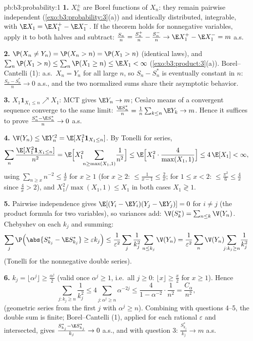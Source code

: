\begin{solution}{pb:b3:probability:1}
\textbf{1.} $X_n^{\pm}$ are Borel functions of $X_n$: they
remain pairwise independent
(\cref{exo:b3:probability:3}(a)) and identically
distributed, integrable, with $\E X_1 = \E X_1^+ - \E
X_1^-$. If the theorem holds for nonnegative variables,
apply it to both halves and subtract:
$\frac{S_n}n = \frac{S_n^+}n - \frac{S_n^-}n \to \E X_1^+ -
\E X_1^- = m$ a.s.

\textbf{2.} $\P(X_n \neq Y_n) = \P(X_n > n) = \P(X_1 > n)$
(identical laws), and $\sum_n\P(X_1 > n) \leq \sum_n\P(X_1
\geq n) \leq \E X_1 < \infty$
(\cref{exo:b3:product:3}(a)). Borel--Cantelli (1): a.s.\
$X_n = Y_n$ for all large $n$, so $S_n - S_n^*$ is
eventually constant in $n$: $\frac{S_n - S_n^*}n \to 0$
a.s., and the two normalized sums share their asymptotic
behavior.

\textbf{3.} $X_1\mathbf 1_{X_1 \leq n} \nearrow X_1$: MCT
gives $\E Y_n \to m$; Ces\`aro means of a convergent
sequence converge to the same limit: $\frac{\E S_n^*}n =
\frac1n\sum_{k\leq n}\E Y_k \to m$. Hence it suffices to
prove $\frac{S^*_n - \E S^*_n}{n} \to 0$ a.s.

\textbf{4.} $\V(Y_n) \leq \E Y_n^2 = \E[X_1^2\mathbf
1_{X_1\leq n}]$. By Tonelli for series,
\[
\sum_n\frac{\E[X_1^2\mathbf 1_{X_1\leq n}]}{n^2}
= \E\Bigl[X_1^2\!\!\sum_{n \geq \max(X_1, 1)}\!\frac1{n^2}
\Bigr]
\leq \E\Bigl[X_1^2\cdot\frac{4}{\max(X_1,1)}\Bigr]
\leq 4\,\E[X_1] < \infty,
\]
using $\sum_{n\geq x}n^{-2} \leq \frac4x$ for $x \geq 1$
(for $x \geq 2$: $\leq \frac1{x-1} \leq \frac2x$; for $1
\leq x < 2$: $\leq \frac{\pi^2}6 \leq \frac4x$ since
$\frac4x > 2$), and $X_1^2/\max(X_1, 1) \leq X_1$ in both
cases $X_1 \gtrless 1$.

\textbf{5.} Pairwise independence gives $\E[(Y_i - \E
Y_i)(Y_j - \E Y_j)] = 0$ for $i \neq j$ (the product
formula for two variables), so variances add: $\V(S^*_k) =
\sum_{n\leq k}\V(Y_n)$. Chebyshev on each $k_j$ and
summing:
\[
\sum_j\P\Bigl(\abs{S^*_{k_j} - \E S^*_{k_j}} \geq
\varepsilon k_j\Bigr)
\leq \frac1{\varepsilon^2}\sum_j\frac1{k_j^2}\sum_{n\leq
k_j}\V(Y_n)
= \frac1{\varepsilon^2}\sum_n\V(Y_n)\!\!\sum_{j : k_j\geq
n}\!\frac1{k_j^2}
\]
(Tonelli for the nonnegative double series).

\textbf{6.} $k_j = \lfloor\alpha^j\rfloor \geq
\frac{\alpha^j}2$ (valid once $\alpha^j \geq 1$, i.e.\ all
$j \geq 0$: $\lfloor x\rfloor \geq \frac x2$ for $x \geq
1$). Hence
\[
\sum_{j : k_j \geq n}\frac1{k_j^2}
\leq 4\sum_{j : \alpha^j \geq n}\alpha^{-2j}
\leq \frac{4}{1 - \alpha^{-2}}\cdot\frac1{n^2}
= \frac{C_\alpha}{n^2},
\]
(geometric series from the first $j$ with $\alpha^j \geq
n$). Combining with questions 4--5, the double sum is
finite; Borel--Cantelli (1), applied for each rational
$\varepsilon$ and intersected, gives
$\frac{S^*_{k_j} - \E S^*_{k_j}}{k_j} \to 0$ a.s., and with
question 3: $\frac{S^*_{k_j}}{k_j} \to m$ a.s.


\end{solution}
